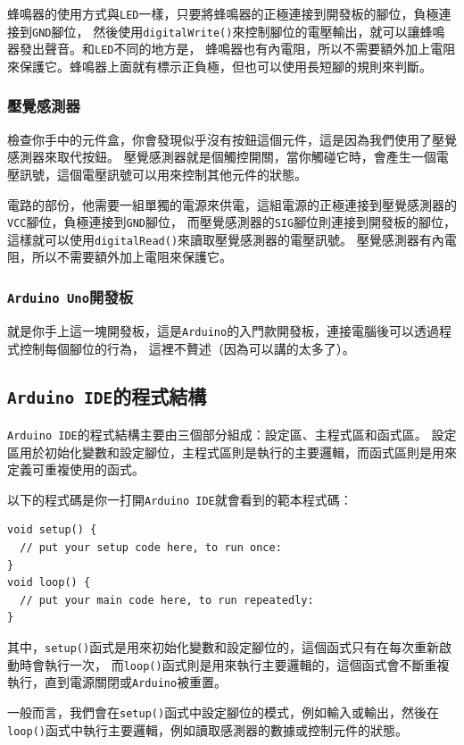 \documentclass[12pt,a4paper]{article}
\begin{document}
蜂鳴器的使用方式與\texttt{LED}一樣，只要將蜂鳴器的正極連接到開發板的腳位，負極連接到\texttt{GND}腳位，
然後使用\texttt{digitalWrite()}來控制腳位的電壓輸出，就可以讓蜂鳴器發出聲音。和\texttt{LED}不同的地方是，
蜂鳴器也有內電阻，所以不需要額外加上電阻來保護它。蜂鳴器上面就有標示正負極，但也可以使用長短腳的規則來判斷。


\subsubsection{壓覺感測器}

檢查你手中的元件盒，你會發現似乎沒有按鈕這個元件，這是因為我們使用了壓覺感測器來取代按鈕。
壓覺感測器就是個觸控開關，當你觸碰它時，會產生一個電壓訊號，這個電壓訊號可以用來控制其他元件的狀態。

電路的部份，他需要一組單獨的電源來供電，這組電源的正極連接到壓覺感測器的\texttt{VCC}腳位，負極連接到\texttt{GND}腳位，
而壓覺感測器的\texttt{SIG}腳位則連接到開發板的腳位，
這樣就可以使用\texttt{digitalRead()}來讀取壓覺感測器的電壓訊號。
壓覺感測器有內電阻，所以不需要額外加上電阻來保護它。

\subsubsection{\texttt{Arduino Uno}開發板}
就是你手上這一塊開發板，這是\texttt{Arduino}的入門款開發板，連接電腦後可以透過程式控制每個腳位的行為，
這裡不贅述（因為可以講的太多了）。



\subsection{\texttt{Arduino IDE}的程式結構}
\texttt{Arduino IDE}的程式結構主要由三個部分組成：設定區、主程式區和函式區。
設定區用於初始化變數和設定腳位，主程式區則是執行的主要邏輯，而函式區則是用來定義可重複使用的函式。

以下的程式碼是你一打開\texttt{Arduino IDE}就會看到的範本程式碼：
\begin{lstlisting}
void setup() {
  // put your setup code here, to run once:
}
void loop() {
  // put your main code here, to run repeatedly:
}
\end{lstlisting}

其中，\texttt{setup()}函式是用來初始化變數和設定腳位的，這個函式只有在每次重新啟動時會執行一次，
而\texttt{loop()}函式則是用來執行主要邏輯的，這個函式會不斷重複執行，直到電源關閉或\texttt{Arduino}被重置。

一般而言，我們會在\texttt{setup()}函式中設定腳位的模式，例如輸入或輸出，然後在\texttt{loop()}函式中執行主要邏輯，例如讀取感測器的數據或控制元件的狀態。
\end{document}
